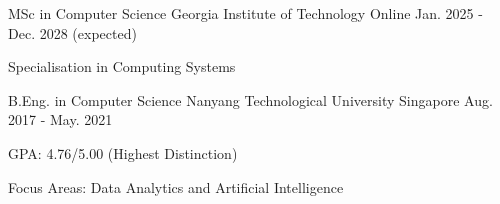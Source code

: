 

\begin{cventries}

  \cventry
    {MSc in Computer Science} %
    {Georgia Institute of Technology} %
    {Online} %
    {Jan. 2025 - Dec. 2028 (expected)} %
    {
      \begin{cvitems} %
        \item {Specialisation in Computing Systems}
      \end{cvitems}
    }

  \cventry
    {B.Eng. in Computer Science} %
    {Nanyang Technological University} %
    {Singapore} %
    {Aug. 2017 - May. 2021} %
    {
      \begin{cvitems} %
        \item {GPA: 4.76/5.00 (Highest Distinction)}
        \item {Focus Areas: Data Analytics and Artificial Intelligence}
      \end{cvitems}
    }


\end{cventries}
